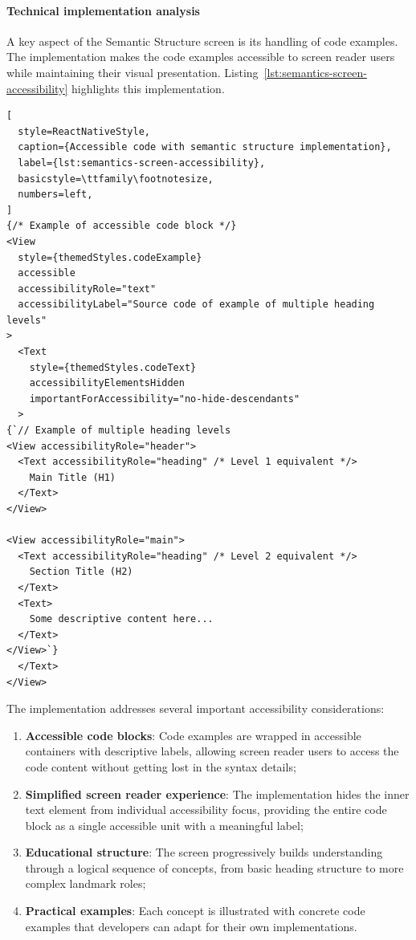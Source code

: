 \paragraph{Technical implementation analysis}

A key aspect of the Semantic Structure screen is its handling of code examples. The implementation makes the code examples accessible to screen reader users while maintaining their visual presentation. Listing~\ref{lst:semantics-screen-accessibility} highlights this implementation.

\begin{lstlisting}[
  style=ReactNativeStyle,
  caption={Accessible code with semantic structure implementation},
  label={lst:semantics-screen-accessibility},
  basicstyle=\ttfamily\footnotesize,
  numbers=left,
]
{/* Example of accessible code block */}
<View
  style={themedStyles.codeExample}
  accessible
  accessibilityRole="text"
  accessibilityLabel="Source code of example of multiple heading levels"
>
  <Text
    style={themedStyles.codeText}
    accessibilityElementsHidden
    importantForAccessibility="no-hide-descendants"
  >
{`// Example of multiple heading levels
<View accessibilityRole="header">
  <Text accessibilityRole="heading" /* Level 1 equivalent */>
    Main Title (H1)
  </Text>
</View>

<View accessibilityRole="main">
  <Text accessibilityRole="heading" /* Level 2 equivalent */>
    Section Title (H2)
  </Text>
  <Text>
    Some descriptive content here...
  </Text>
</View>`}
  </Text>
</View>
\end{lstlisting}

The implementation addresses several important accessibility considerations:

\begin{enumerate}
    \item \textbf{Accessible code blocks}: Code examples are wrapped in accessible containers with descriptive labels, allowing screen reader users to access the code content without getting lost in the syntax details;
    
    \item \textbf{Simplified screen reader experience}: The implementation hides the inner text element from individual accessibility focus, providing the entire code block as a single accessible unit with a meaningful label;
    
    \item \textbf{Educational structure}: The screen progressively builds understanding through a logical sequence of concepts, from basic heading structure to more complex landmark roles;
    
    \item \textbf{Practical examples}: Each concept is illustrated with concrete code examples that developers can adapt for their own implementations.
\end{enumerate}

